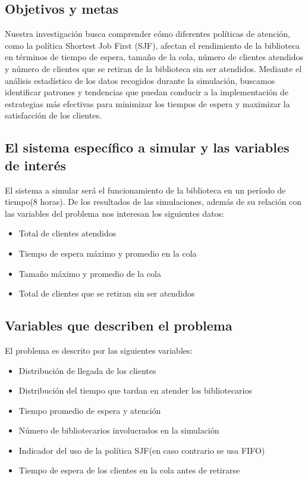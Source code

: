 \documentclass[10pt,twocolumn]{article}
\begin{document}
\subsection{Objetivos y metas}
Nuestra investigación busca comprender cómo diferentes políticas de atención, como la política Shortest Job First (SJF), afectan el rendimiento de la biblioteca en términos de tiempo de espera, tamaño de la cola, número de clientes atendidos y número de clientes que se retiran de la biblioteca sin ser atendidos. Mediante el análisis estadístico de los datos recogidos durante la simulación, buscamos identificar patrones y tendencias que puedan conducir a la implementación de estrategias más efectivas para minimizar los tiempos de espera y maximizar la satisfacción de los clientes.

\subsection{El sistema específico a simular y las variables de interés}
El sistema a simular será el funcionamiento de la biblioteca en un período de tiempo(8 horas). De los resultados de las simulaciones, además de su relación con las variables del problema nos interesan los siguientes datos:
\begin{itemize}
	\item Total de clientes atendidos
	\item Tiempo de espera máximo y promedio en la cola
	\item Tamaño máximo y promedio de la cola
	\item Total de clientes que se retiran sin ser atendidos
\end{itemize}

\subsection{Variables que describen el problema}
El problema es descrito por las siguientes variables:
\begin{itemize}
	\item Distribución de llegada de los clientes
	\item Distribución del tiempo que tardan en atender los bibliotecarios
	\item Tiempo promedio de espera y atención
	\item Número de bibliotecarios involucrados en la simulación
	\item Indicador del uso de la política SJF(en caso contrario se usa FIFO)
	\item Tiempo de espera de los clientes en la cola antes de retirarse
\end{itemize}
\end{document}

